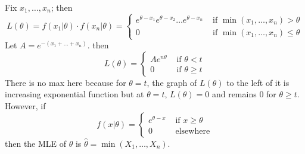 \documentclass[12pt]{article}
\begin{document}
Fix $x_1,\dots,x_n$; then $$L(\theta) = f(x_1|\theta)\cdot f(x_n|\theta) = \begin{cases} e^{\theta -x_1} e^{\theta-x_2} \dots e^{\theta-x_n} &\text{ if } \min(x_1,\dots,x_n) > \theta \\ 0 &\text{ if } \min(x_1,\dots,x_n) \leq \theta \end{cases} $$ 
Let $A = e^{-(x_1 + \dots + x_n)}$. then $$ L(\theta) = \begin{cases} Ae^{n\theta} &\text{ if }\theta < t \\ 0 &\text{ if } \theta \geq t \end{cases} $$ 
There is no max here because for $\theta = t$, the graph of $L(\theta)$ to the left of it is increasing exponential function but at $\theta = t$, $L(\theta) = 0$ and remains $0$ for $\theta \geq t$. However, if $$f(x|\theta) = \begin{cases} e^{\theta-x} &\text{ if } x \geq \theta \\ 0 &\text{ elsewhere} \end{cases} $$ then the MLE of $\theta$ is $\hat{\theta} = \min(X_1,\dots,X_n)$. 
\end{document}
